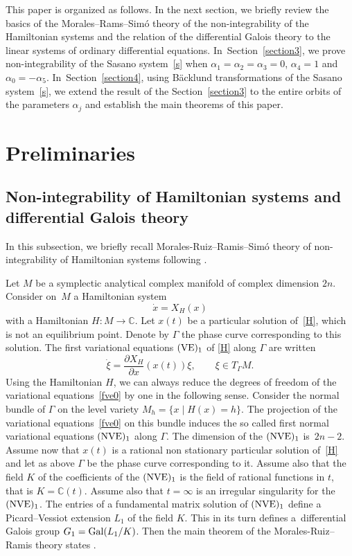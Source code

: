 \documentclass[10pt,a4paper]{amsart}
\numberwithin{equation}{section}
\begin{document}
 This paper is organized as follows. In the next section, we briefly review the basics of the Morales--Rams--Sim\'{o} theory
 of the non-integrability of the Hamiltonian systems and the relation of the differential Galois theory to the linear
 systems of ordinary differential equations. In~Section~\ref{section3}, we prove non-integrability of the Sasano system~\eqref{s} when
 $\alpha_1=\alpha_2=\alpha_3=0$, $\alpha_4=1$ and $\alpha_0=-\alpha_5$. In~Section~\ref{section4}, using B\"{a}cklund transformations
 of the Sasano system~\eqref{s}, we extend the result of the Section~\ref{section3} to the entire orbits of the parameters $\alpha_j$
 and establish the main theorems of this paper.

 \section{Preliminaries}

 \subsection{Non-integrability of Hamiltonian systems and differential Galois theory}
 In this subsection, we briefly recall Morales-Ruiz--Ramis--Sim\'{o} theory of non-integrability of Hamiltonian systems following
 \cite{MR,MR2, MR1, MRS}.

Let $M$ be a symplectic analytical complex manifold of complex dimension $2 n$. Consider on~$M$ a Hamiltonian system
 \begin{equation}
 \dot{x}=X_H(x)\label{H}
 \end{equation}
 with a Hamiltonian $H \colon M \rightarrow \mathbb{C}$. Let $x(t)$ be a particular solution of~\eqref{H}, which is not an equilibrium point.
 Denote by $\Gamma$ the phase curve corresponding to this solution. The first variational equations $({\rm VE})_1$ of
 \eqref{H} along $\Gamma$ are written
 \begin{equation}
 \dot{\xi}=\frac{\partial X_H}{\partial x} (x(t)) \xi,\qquad \xi\in T_{\Gamma}M .\label{fve0}
 \end{equation}
 Using the Hamiltonian $H$, we can always reduce the degrees of freedom of the variational equations~\eqref{fve0} by one in the
 following sense. Consider the normal bundle of $\Gamma$ on the level variety $M_h=\{ x \mid H(x)=h\}$. The projection of the
 variational equations~\eqref{fve0} on this bundle induces the so called first normal variational equations $({\rm NVE})_1$ along $\Gamma$.
 The dimension of the $({\rm NVE})_1$ is~${2 n-2}$. Assume now that $x(t)$ is a rational non stationary particular solution of~\eqref{H} and let as above
 $\Gamma$ be the phase curve corresponding to it. Assume also that the field $K$ of the coefficients of the $({\rm NVE})_1$ is the field of rational functions in $t$,
 that is $K=\mathbb{C}(t)$. Assume also that $t=\infty$ is an irregular singularity for the $({\rm NVE})_1$.
 The entries of a fundamental matrix solution of $({\rm NVE})_1$ define a Picard--Vessiot extension $L_1$ of the field $K$.
 This in its turn defines a~differential Galois group
 $G_1={\rm Gal}(L_1/K)$.
 Then the main theorem of the Morales-Ruiz--Ramis theory states \cite{MR, MR2, MRS}.
\end{document}

